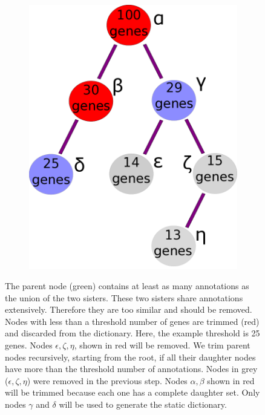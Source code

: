 \documentclass{bmcart}
\begin{document}
\begin{backmatter}
\begin{figure}[h!]
\begin{subfigure}[b]{0.3\textwidth}
    \includegraphics[width=\textwidth]{figures/CeilingTrimmingOntogeny.png}
    	\caption{}
    \label{fig:trim_roots}
  \end{subfigure}

  \captionsetup{width= 0.95\textwidth}
  \caption{
     The parent node (green) contains at least as many annotations as the union of the two sisters. These two sisters share annotations extensively. Therefore they are too similar and should be removed. 	 Nodes with less than a threshold number of genes are trimmed (red) and discarded from the dictionary. Here, the example threshold is 25 genes. Nodes $\epsilon, \zeta, \eta$, shown in red will be removed.
	 We trim parent nodes recursively, starting from the root, if all their daughter nodes have more than the threshold number of annotations. Nodes in grey ($\epsilon, \zeta, \eta$) were removed in the previous step. Nodes $\alpha, \beta$ shown in red will be trimmed because each one has a complete daughter set. Only nodes $\gamma$ and $\delta$ will be used to generate the static dictionary. 
  }
\end{figure}




\end{backmatter}
\end{document}
